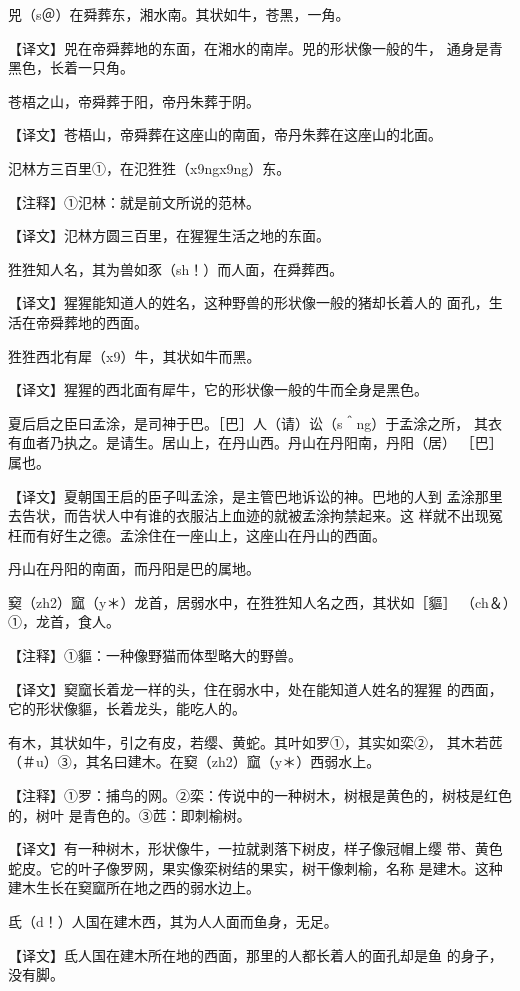 \documentclass[a4paper,12pt,UTF8,twoside]{ctexbook}
\begin{document}
兕（s＠）在舜葬东，湘水南。其状如牛，苍黑，一角。

【译文】兕在帝舜葬地的东面，在湘水的南岸。兕的形状像一般的牛， 通身是青黑色，长着一只角。

苍梧之山，帝舜葬于阳，帝丹朱葬于阴。

【译文】苍梧山，帝舜葬在这座山的南面，帝丹朱葬在这座山的北面。

氾林方三百里①，在氾狌狌（x9ngx9ng）东。

【注释】①氾林：就是前文所说的范林。

【译文】氾林方圆三百里，在猩猩生活之地的东面。

狌狌知人名，其为兽如豕（sh！）而人面，在舜葬西。

【译文】猩猩能知道人的姓名，这种野兽的形状像一般的猪却长着人的 面孔，生活在帝舜葬地的西面。

狌狌西北有犀（x9）牛，其状如牛而黑。

【译文】猩猩的西北面有犀牛，它的形状像一般的牛而全身是黑色。

夏后启之臣曰孟涂，是司神于巴。［巴］人（请）讼（s＾ng）于孟涂之所， 其衣有血者乃执之。是请生。居山上，在丹山西。丹山在丹阳南，丹阳（居） ［巴］　属也。

【译文】夏朝国王启的臣子叫孟涂，是主管巴地诉讼的神。巴地的人到 孟涂那里去告状，而告状人中有谁的衣服沾上血迹的就被孟涂拘禁起来。这 样就不出现冤枉而有好生之德。孟涂住在一座山上，这座山在丹山的西面。

丹山在丹阳的南面，而丹阳是巴的属地。

窫（zh2）窳（y＊）龙首，居弱水中，在狌狌知人名之西，其状如［貙］ （ch＆）①，龙首，食人。

【注释】①貙：一种像野猫而体型略大的野兽。

【译文】窫窳长着龙一样的头，住在弱水中，处在能知道人姓名的猩猩 的西面，它的形状像貙，长着龙头，能吃人的。

有木，其状如牛，引之有皮，若缨、黄蛇。其叶如罗①，其实如栾②， 其木若苉（＃u）③，其名曰建木。在窫（zh2）窳（y＊）西弱水上。

【注释】①罗：捕鸟的网。②栾：传说中的一种树木，树根是黄色的，树枝是红色的，树叶 是青色的。③苉：即刺榆树。

【译文】有一种树木，形状像牛，一拉就剥落下树皮，样子像冠帽上缨 带、黄色蛇皮。它的叶子像罗网，果实像栾树结的果实，树干像刺榆，名称 是建木。这种建木生长在窫窳所在地之西的弱水边上。

氐（d！）人国在建木西，其为人人面而鱼身，无足。

【译文】氐人国在建木所在地的西面，那里的人都长着人的面孔却是鱼 的身子，没有脚。
\end{document}
